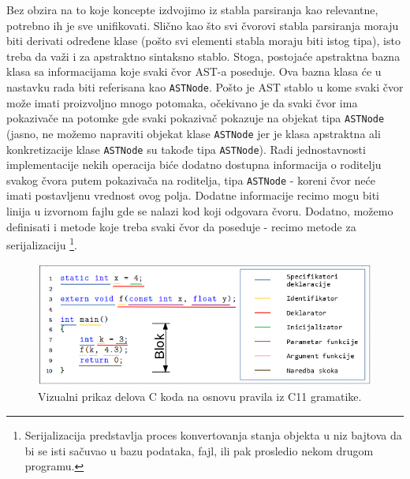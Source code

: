 Bez obzira na to koje koncepte izdvojimo iz stabla parsiranja kao relevantne, potrebno ih je sve unifikovati. Slično kao što svi čvorovi stabla parsiranja moraju biti derivati određene klase (pošto svi elementi stabla moraju biti istog tipa), isto treba da važi i za apstraktno sintaksno stablo. Stoga, postojaće apstraktna bazna klasa sa informacijama koje svaki čvor AST-a poseduje. Ova bazna klasa će u nastavku rada biti referisana kao \texttt{ASTNode}. Pošto je AST stablo u kome svaki čvor može imati proizvoljno mnogo potomaka, očekivano je da svaki čvor ima pokazivače na potomke gde svaki pokazivač pokazuje na objekat tipa \texttt{ASTNode} (jasno, ne možemo napraviti objekat klase \texttt{ASTNode} jer je klasa apstraktna ali konkretizacije klase \texttt{ASTNode} su takođe tipa \texttt{ASTNode}). Radi jednostavnosti implementacije nekih operacija biće dodatno dostupna informacija o roditelju svakog čvora putem pokazivača na roditelja, tipa \texttt{ASTNode} - koreni čvor neće imati postavljenu vrednost ovog polja. Dodatne informacije recimo mogu biti linija u izvornom fajlu gde se nalazi kod koji odgovara čvoru. Dodatno, možemo definisati i metode koje treba svaki čvor da poseduje - recimo metode za serijalizaciju \footnote{Serijalizacija predstavlja proces konvertovanja stanja objekta u niz bajtova da bi se isti sačuvao u bazu podataka, fajl, ili pak prosledio nekom drugom programu.}. 

\begin{figure}[h!]
    \centering
        \includegraphics[scale=0.9]{images/c_code_decomposition.png}
    \caption{Vizualni prikaz delova C koda na osnovu pravila iz C11 gramatike.}
    \label{fig:CDecomposition}
\end{figure}

